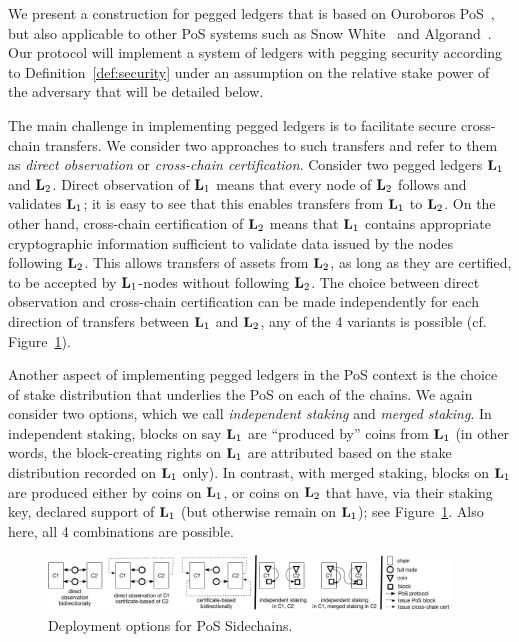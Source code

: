 We present a construction for pegged ledgers
that is based
on Ouroboros PoS~\cite{ouroboros}, but also applicable to other PoS
systems such as Snow White~\cite{snowwhite}
and Algorand~\cite{algorand}.
Our protocol
will implement a system of ledgers with pegging %
security
according to
Definition~\ref{def:security} under an assumption on the relative stake power of the
adversary that will be detailed below.

The main challenge in implementing pegged ledgers is to facilitate secure
cross-chain transfers.  We consider two approaches to such transfers and refer
to them as {\em direct observation} or {\em cross-chain certification}. Consider
two pegged ledgers $\mathbf{L}_1$ and $\mathbf{L}_2$.  Direct observation of $\mathbf{L}_1$ means that
every node of $\mathbf{L}_2$ follows and validates $\mathbf{L}_1$; it is easy to see that this
enables transfers from $\mathbf{L}_1$ to $\mathbf{L}_2$.  On the other hand, cross-chain
certification of $\mathbf{L}_2$ means that $\mathbf{L}_1$ contains appropriate cryptographic
information sufficient to validate data issued by the nodes following $\mathbf{L}_2$.
This allows transfers of assets from $\mathbf{L}_2$, as long as they are certified, to be
accepted by $\mathbf{L}_1$-nodes without following $\mathbf{L}_2$.
The choice between direct observation and cross-chain certification can be made
independently for each direction of transfers between $\mathbf{L}_1$ and $\mathbf{L}_2$, any of
the 4 variants is possible (cf. Figure~\ref{fig:sidechain-options}).

Another aspect of implementing pegged ledgers in the PoS context is the choice
of stake distribution that underlies the PoS on each of the chains.
We again consider two options, which we call  {\em independent
staking} and {\em merged staking}. In independent staking, blocks on
say $\mathbf{L}_1$ are ``produced by'' coins from $\mathbf{L}_1$ (in other words, the
block-creating rights on $\mathbf{L}_1$ are attributed based on the stake distribution
recorded on $\mathbf{L}_1$ only).
In contrast, with merged staking, blocks on $\mathbf{L}_1$ are
produced either by coins on $\mathbf{L}_1$, or coins on $\mathbf{L}_2$ that have, via their
staking key, declared support of $\mathbf{L}_1$ (but otherwise remain on $\mathbf{L}_1$); see
Figure~\ref{fig:sidechain-options}. Also here, all 4 combinations are possible.

\begin{figure}
\begin{center}
    \includegraphics[width=0.95\textwidth]{chapters/sidechains/figures/sidechains-options.png}
  \caption{Deployment options for PoS Sidechains.}
  \label{fig:sidechain-options}
  \end{center}
\end{figure}

